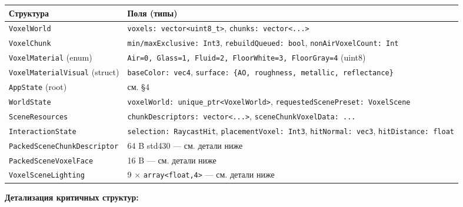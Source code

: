 \begin{longtable}[]{@{}ll@{}}
\toprule\noalign{}
Структура & Поля (типы) \\
\midrule\noalign{}
\endhead
\bottomrule\noalign{}
\endlastfoot
\texttt{VoxelWorld} & \texttt{voxels:\ vector\textless{}uint8\_t\textgreater{}}, \texttt{chunks:\ vector\textless{}...\textgreater{}} \\
\texttt{VoxelChunk} & \texttt{min/maxExclusive:\ Int3}, \texttt{rebuildQueued:\ bool}, \texttt{nonAirVoxelCount:\ Int} \\
\texttt{VoxelMaterial} (enum) & \texttt{Air=0,\ Glass=1,\ Fluid=2,\ FloorWhite=3,\ FloorGray=4} (uint8) \\
\texttt{VoxelMaterialVisual} (struct) & \texttt{baseColor:\ vec4}, \texttt{surface:\ \{AO,\ roughness,\ metallic,\ reflectance\}} \\
\texttt{AppState} (root) & см. §4 \\
\texttt{WorldState} & \texttt{voxelWorld:\ unique\_ptr\textless{}VoxelWorld\textgreater{}}, \texttt{requestedScenePreset:\ VoxelScene} \\
\texttt{SceneResources} & \texttt{chunkDescriptors:\ vector\textless{}...\textgreater{}}, \texttt{sceneChunkVoxelData:\ ...} \\
\texttt{InteractionState} & \texttt{selection:\ RaycastHit}, \texttt{placementVoxel:\ Int3}, \texttt{hitNormal:\ vec3}, \texttt{hitDistance:\ float} \\
\texttt{PackedSceneChunkDescriptor} & 64 B std430 --- см. детали ниже \\
\texttt{PackedSceneVoxelFace} & 16 B --- см. детали ниже \\
\texttt{VoxelSceneLighting} & 9 × \texttt{array\textless{}float,4\textgreater{}} --- см. детали ниже \\
\end{longtable}

\textbf{Детализация критичных структур:}

